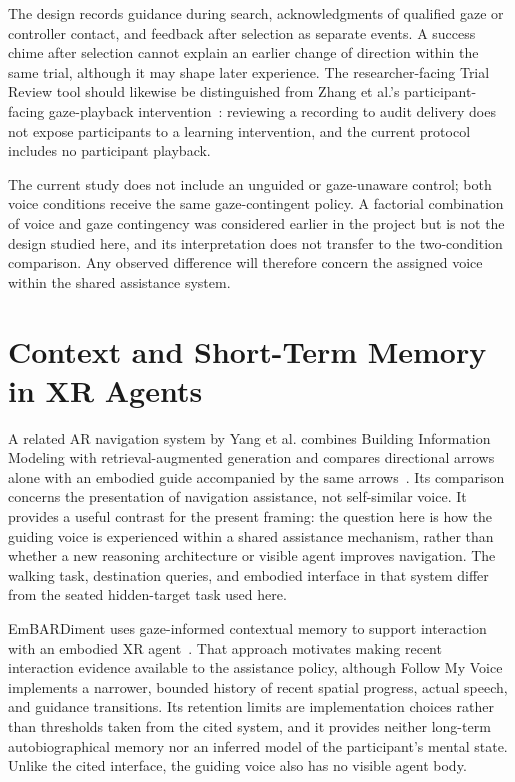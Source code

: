 The design records guidance during search, acknowledgments of qualified gaze or controller contact, and feedback after selection as separate events. A success chime after selection cannot explain an earlier change of direction within the same trial, although it may shape later experience. The researcher-facing Trial Review tool should likewise be distinguished from Zhang et al.'s participant-facing gaze-playback intervention~\cite{zhang2023seehear}: reviewing a recording to audit delivery does not expose participants to a learning intervention, and the current protocol includes no participant playback.

The current study does not include an unguided or gaze-unaware control; both voice conditions receive the same gaze-contingent policy. A factorial combination of voice and gaze contingency was considered earlier in the project but is not the design studied here, and its interpretation does not transfer to the two-condition comparison. Any observed difference will therefore concern the assigned voice within the shared assistance system.

\section{Context and Short-Term Memory in XR Agents}
A related AR navigation system by Yang et al. combines Building Information Modeling with retrieval-augmented generation and compares directional arrows alone with an embodied guide accompanied by the same arrows~\cite{yang2025embodiednavigation}. Its comparison concerns the presentation of navigation assistance, not self-similar voice. It provides a useful contrast for the present framing: the question here is how the guiding voice is experienced within a shared assistance mechanism, rather than whether a new reasoning architecture or visible agent improves navigation. The walking task, destination queries, and embodied interface in that system differ from the seated hidden-target task used here.

EmBARDiment uses gaze-informed contextual memory to support interaction with an embodied XR agent~\cite{bovo2025embardiment}. That approach motivates making recent interaction evidence available to the assistance policy, although Follow My Voice implements a narrower, bounded history of recent spatial progress, actual speech, and guidance transitions. Its retention limits are implementation choices rather than thresholds taken from the cited system, and it provides neither long-term autobiographical memory nor an inferred model of the participant's mental state. Unlike the cited interface, the guiding voice also has no visible agent body.

